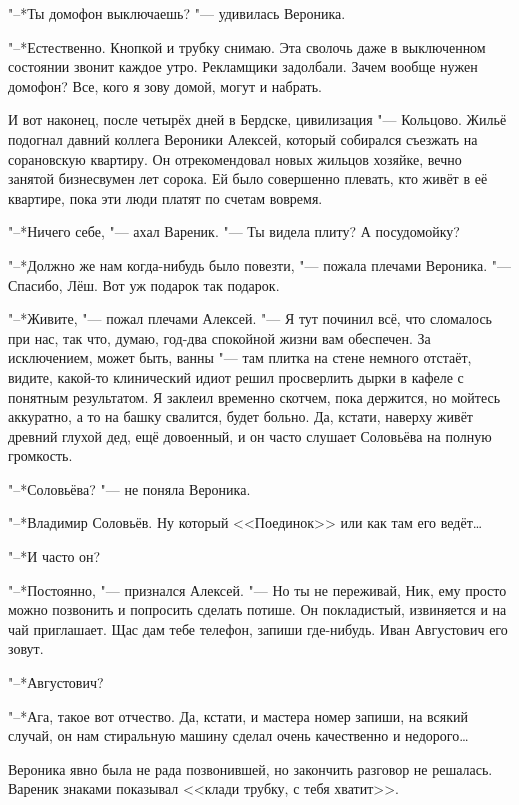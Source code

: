 "--*Ты домофон выключаешь? "--- удивилась Вероника.

"--*Естественно.
Кнопкой и трубку снимаю.
Эта сволочь даже в выключенном состоянии звонит каждое утро.
Рекламщики задолбали.
Зачем вообще нужен домофон?
Все, кого я зову домой, могут и набрать.

И вот наконец, после четырёх дней в Бердске, цивилизация "--- Кольцово.
Жильё подогнал давний коллега Вероники Алексей, который собирался съезжать на сорановскую квартиру.
Он отрекомендовал новых жильцов хозяйке, вечно занятой бизнесвумен лет сорока.
Ей было совершенно плевать, кто живёт в её квартире, пока эти люди платят по счетам вовремя.

"--*Ничего себе, "--- ахал Вареник.
"--- Ты видела плиту?
А посудомойку?

"--*Должно же нам когда-нибудь было повезти, "--- пожала плечами Вероника.
"--- Спасибо, Лёш.
Вот уж подарок так подарок.

"--*Живите, "--- пожал плечами Алексей.
"--- Я тут починил всё, что сломалось при нас, так что, думаю, год-два спокойной жизни вам обеспечен.
За исключением, может быть, ванны "--- там плитка на стене немного отстаёт, видите, какой-то клинический идиот решил просверлить дырки в кафеле с понятным результатом.
Я заклеил временно скотчем, пока держится, но мойтесь аккуратно, а то на башку свалится, будет больно.
Да, кстати, наверху живёт древний глухой дед, ещё довоенный, и он часто слушает Соловьёва на полную громкость.

"--*Соловьёва? "--- не поняла Вероника.

"--*Владимир Соловьёв.
Ну который <<Поединок>> или как там его ведёт\ldots{}

"--*И часто он?

"--*Постоянно, "--- признался Алексей.
"--- Но ты не переживай, Ник, ему просто можно позвонить и попросить сделать потише.
Он покладистый, извиняется и на чай приглашает.
Щас дам тебе телефон, запиши где-нибудь.
Иван Августович его зовут.

"--*Августович?

"--*Ага, такое вот отчество.
Да, кстати, и мастера номер запиши, на всякий случай, он нам стиральную машину сделал очень качественно и недорого\ldots{}

\asterism

\textspace

Вероника явно была не рада позвонившей, но закончить разговор не решалась.
Вареник знаками показывал <<клади трубку, с тебя хватит>>.

